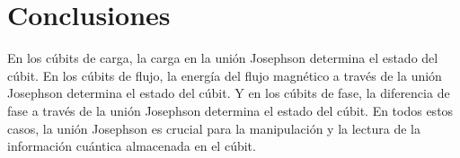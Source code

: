 \documentclass[12pt]{article}
\begin{document}
\section{Conclusiones}
En los cúbits de carga, la carga en la unión Josephson determina el estado del cúbit. En los cúbits de flujo, la energía del flujo magnético a través de la unión Josephson determina el estado del cúbit. Y en los cúbits de fase, la diferencia de fase a través de la unión Josephson determina el estado del cúbit. En todos estos casos, la unión Josephson es crucial para la manipulación y la lectura de la información cuántica almacenada en el cúbit.

\newpage
\printbibliography
\end{document}
